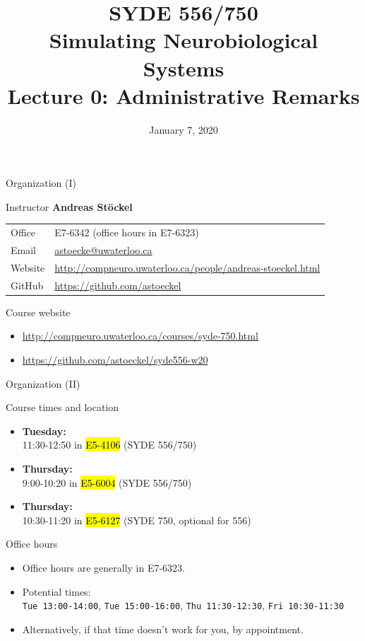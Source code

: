\documentclass[aspectratio=169]{beamer}
\date{January 7, 2020}
\title{SYDE 556/750 \\ Simulating Neurobiological Systems \\ Lecture 0: Administrative Remarks}
\begin{document}
	
\begin{frame}{}
	\MakeTitle
\end{frame}

\begin{frame}{Organization (I)}
	\begin{block}{Instructor}
		\vspace{2mm}
		\textbf{Andreas Stöckel}\\[2mm]
		\hspace{-2.5mm}\begin{tabular}{l l}
			Office & E7-6342 (office hours in E7-6323)\\
			Email & \url{astoecke@uwaterloo.ca}\\
			Website & \url{http://compneuro.uwaterloo.ca/people/andreas-stoeckel.html}\\
			GitHub & \url{https://github.com/astoeckel}
		\end{tabular}
	\end{block}
 
	\vfill

	\begin{block}{Course website}
		\begin{itemize}
			\item \url{http://compneuro.uwaterloo.ca/courses/syde-750.html}
			\item \url{https://github.com/astoeckel/syde556-w20}
		\end{itemize}
	\end{block}
\end{frame}

\begin{frame}{Organization (II)}
	\begin{block}{Course times and location}
		\begin{itemize}
			\item \textbf{Tuesday:}\\
			11:30-12:50 in \hl{E5-4106} (SYDE 556/750)
			\item \textbf{Thursday:}\\
			9:00-10:20 in \hl{E5-6004} (SYDE 556/750) 
			\item \textbf{Thursday:}\\10:30-11:20 in \hl{E5-6127} (SYDE 750, optional for 556)
		\end{itemize}
	\end{block}

	\begin{block}{Office hours}
		\begin{itemize}
			\item Office hours are generally in E7-6323.
			\item Potential times:\\
			\texttt{Tue 13:00-14:00}, \texttt{Tue 15:00-16:00}, \texttt{Thu 11:30-12:30}, \texttt{Fri 10:30-11:30}
			\item Alternatively, if that time doesn't work for you, by appointment.
		\end{itemize}
	\end{block}
\end{frame}
\end{document}
